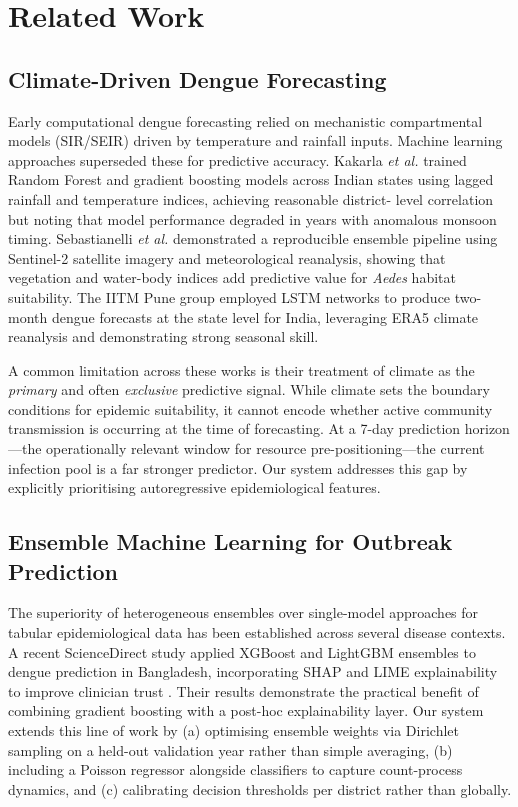 \documentclass[conference]{IEEEtran}
\begin{document}
\section{Related Work}
\label{sec:related}

\subsection{Climate-Driven Dengue Forecasting}

Early computational dengue forecasting relied on mechanistic
compartmental models (SIR/SEIR) driven by temperature and rainfall
inputs. Machine learning approaches superseded these for predictive
accuracy. Kakarla \textit{et al.} \cite{kakarla2023} trained Random
Forest and gradient boosting models across Indian states using
lagged rainfall and temperature indices, achieving reasonable district-
level correlation but noting that model performance degraded in years
with anomalous monsoon timing. Sebastianelli \textit{et al.}
\cite{sebastianelli2024} demonstrated a reproducible ensemble pipeline
using Sentinel-2 satellite imagery and meteorological reanalysis,
showing that vegetation and water-body indices add predictive value
for \textit{Aedes} habitat suitability. The IITM Pune group
\cite{iitm2025} employed LSTM networks to produce two-month dengue
forecasts at the state level for India, leveraging ERA5 climate
reanalysis and demonstrating strong seasonal skill.

A common limitation across these works is their treatment of climate
as the \emph{primary} and often \emph{exclusive} predictive signal.
While climate sets the boundary conditions for epidemic suitability,
it cannot encode whether active community transmission is occurring
at the time of forecasting. At a 7-day prediction horizon---the
operationally relevant window for resource pre-positioning---the
current infection pool is a far stronger predictor. Our system
addresses this gap by explicitly prioritising autoregressive
epidemiological features.

\subsection{Ensemble Machine Learning for Outbreak Prediction}

The superiority of heterogeneous ensembles over single-model
approaches for tabular epidemiological data has been established
across several disease contexts. A recent ScienceDirect study
applied XGBoost and LightGBM ensembles to dengue prediction in
Bangladesh, incorporating SHAP and LIME explainability to improve
clinician trust \cite{bangladesh_xai2025}. Their results demonstrate
the practical benefit of combining gradient boosting with a
post-hoc explainability layer. Our system extends this line of work
by (a) optimising ensemble weights via Dirichlet sampling on a
held-out validation year rather than simple averaging, (b) including
a Poisson regressor alongside classifiers to capture count-process
dynamics, and (c) calibrating decision thresholds per district rather
than globally.
\end{document}
